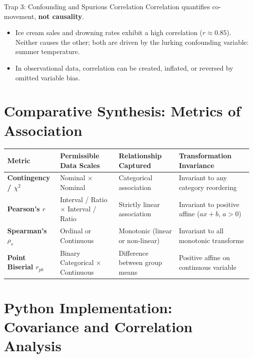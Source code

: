 \begin{trapbox}{Trap 3: Confounding and Spurious Correlation}
Correlation quantifies co-movement, \textbf{not causality}.
\begin{itemize}
    \item Ice cream sales and drowning rates exhibit a high correlation ($r \approx 0.85$). Neither causes the other; both are driven by the lurking confounding variable: summer temperature.
    \item In observational data, correlation can be created, inflated, or reversed by omitted variable bias.
\end{itemize}
\end{trapbox}

\section{Comparative Synthesis: Metrics of Association}

\begin{center}
\renewcommand{\arraystretch}{1.3}
\begin{tabular}{p{2.8cm}p{3.2cm}p{3.5cm}p{3.8cm}}
\toprule
\textbf{Metric} & \textbf{Permissible Data Scales} & \textbf{Relationship Captured} & \textbf{Transformation Invariance} \\
\midrule
\textbf{Contingency / $\chi^2$} & Nominal $\times$ Nominal & Categorical association & Invariant to any category reordering \\
\textbf{Pearson's $r$} & Interval / Ratio $\times$ Interval / Ratio & Strictly linear association & Invariant to positive affine ($ax+b$, $a > 0$) \\
\textbf{Spearman's $\rho_s$} & Ordinal or Continuous & Monotonic (linear or non-linear) & Invariant to all monotonic transforms \\
\textbf{Point Biserial $r_{pb}$} & Binary Categorical $\times$ Continuous & Difference between group means & Positive affine on continuous variable \\
\bottomrule
\end{tabular}
\end{center}

\section{Python Implementation: Covariance and Correlation Analysis}

